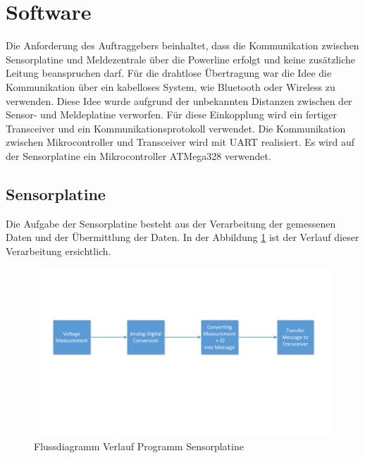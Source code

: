 %
%
%

\section{Software}
Die Anforderung des Auftraggebers beinhaltet, dass die Kommunikation zwischen Sensorplatine und Meldezentrale über die Powerline erfolgt und keine zusätzliche Leitung beanspruchen darf. Für die drahtlose Übertragung war die Idee die Kommunikation über ein kabelloses System, wie Bluetooth oder Wireless zu verwenden. Diese Idee wurde aufgrund der unbekannten Distanzen zwischen der Sensor- und Meldeplatine verworfen. Für diese Einkopplung wird ein fertiger Transceiver und ein Kommunikationsprotokoll verwendet. Die Kommunikation zwischen Mikrocontroller und Transceiver wird mit UART realisiert. Es wird auf der Sensorplatine ein Mikrocontroller ATMega328 verwendet.


\subsection{Sensorplatine}
Die Aufgabe der Sensorplatine besteht aus der Verarbeitung der gemessenen Daten und der Übermittlung der Daten. In der Abbildung \ref{fig:Software_Flussdiagramm_Sensorplatine} ist der Verlauf dieser Verarbeitung ersichtlich.

\begin{figure}[htbp] 
  \centering
     \includegraphics[width=1\textwidth]{graphics/Sensorplatine_Flussdiagramm}
  \caption{Flussdiagramm Verlauf Programm Sensorplatine}
  \label{fig:Software_Flussdiagramm_Sensorplatine}
\end{figure}

